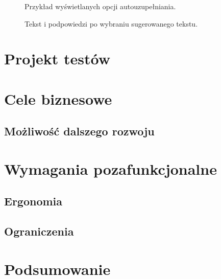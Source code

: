 \documentclass[twoside,a4paper]{book}
\begin{document}
\begin{figure}[!h]
		\centering
		\caption{Przykład wyświetlanych opcji autouzupełniania. }
		\label{fig:auto}
\end{figure}
\begin{figure}[!h]
		\centering
		\caption{Tekst i podpowiedzi po wybraniu sugerowanego tekstu. }
		\label{fig:textAuto}
\end{figure}
\section{Projekt testów}


\section{Cele biznesowe}
\subsection{Możliwość dalszego rozwoju}
\section{Wymagania pozafunkcjonalne}

\subsection{Ergonomia}
\subsection{Ograniczenia}
\section{Podsumowanie}
\end{document}

